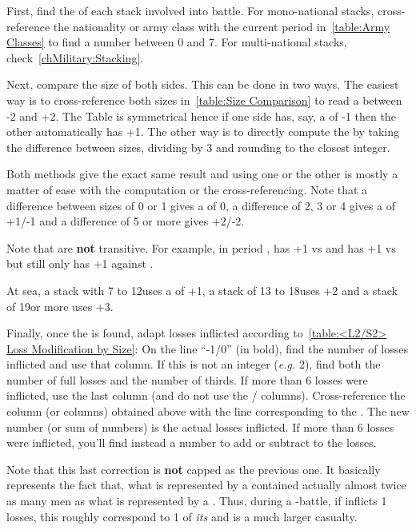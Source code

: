 First, find the  of each stack involved into battle. For
mono-national stacks, cross-reference the nationality or army class with the
current period in~\ref{table:Army Classes} to find a number between 0 and
7. For multi-national stacks, check~\ref{chMilitary:Stacking}.

Next, compare the size of both sides. This can be done in two ways. The
easiest way is to cross-reference both sizes in~\ref{table:Size Comparison} to
read a  between -2 and +2. The Table is symmetrical
hence if one side has, say, a  of -1 then the other
automatically has +1. The other way is to directly compute the  by taking the difference between sizes, dividing by 3 and
rounding to the closest integer.

Both methods give the exact same result and using one or the other is mostly a
matter of ease with the computation or the cross-referencing. Note that a
difference between sizes of 0 or 1 gives a  of 0, a
difference of 2, 3 or 4 gives a  of +1/-1 and a
difference of 5 or more gives +2/-2.

Note that  are \textbf{not} transitive. For example,
in period , \POL has +1 vs \FRA and \FRA has +1 vs \HIS but \POL
still only has +1 against \HIS.

At sea, a stack with 7 to 12\ND uses a  of +1, a
stack of 13 to 18\ND uses +2 and a stack of 19\ND or more uses +3.


\aparag Finally, once the  is found, adapt losses
inflicted according to~\ref{table:<L2/S2> Loss Modification by Size}:
\bparag On the line ``-1/0'' (in bold), find the number of losses inflicted
and use that column. If this is not an integer (\emph{e.g.} 2\td), find
both the number of full losses and the number of thirds. If more than 6 losses
were inflicted, use the last column (and do not use the \texttu/\texttd
columns).
\bparag Cross-reference the column (or columns) obtained above with the line
corresponding to the . The new number (or sum of
numbers) is the actual losses inflicted. If more than 6 losses were inflicted,
you'll find instead a number to add or subtract to the losses.

Note that this last correction is \textbf{not} capped as the previous one. It
basically represents the fact that, what is represented by a \TUR \LD
contained actually almost twice as many men as what is represented by a \HIS
\LD. Thus, during a \TUR-\HIS battle, if \TUR inflicts 1 losses, this roughly
correspond to 1 of \emph{its} \LD and is a much larger \HIS casualty.

